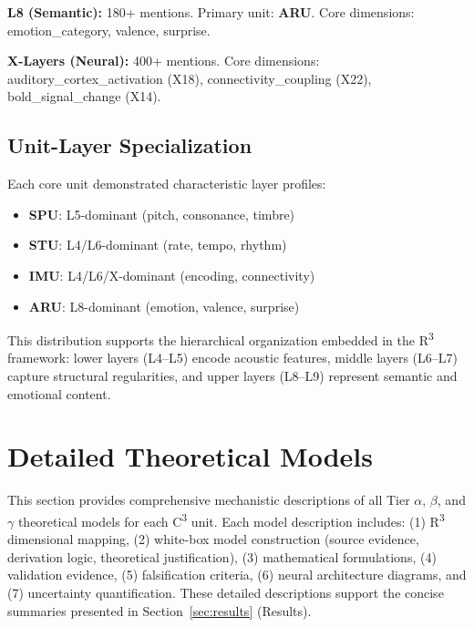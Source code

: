 \documentclass[9pt,onecolumn]{article}
\newcommand{\STU}{\textcolor{stucolor}{\textbf{STU}}}
\newcommand{\IMU}{\textcolor{imucolor}{\textbf{IMU}}}
\newcommand{\SPU}{\textcolor{spucolor}{\textbf{SPU}}}
\newcommand{\ARU}{\textcolor{arucolor}{\textbf{ARU}}}
\newcommand{\Rthree}{R\textsuperscript{3}}
\begin{document}
\textbf{L8 (Semantic):} 180+ mentions. Primary unit: \ARU{}. Core dimensions: emotion\_category, valence, surprise.

\textbf{X-Layers (Neural):} 400+ mentions. Core dimensions: auditory\_cortex\_activation (X18), connectivity\_coupling (X22), bold\_signal\_change (X14).

\subsection{Unit-Layer Specialization}

Each core unit demonstrated characteristic layer profiles:

\begin{itemize}[leftmargin=*, topsep=2pt, itemsep=1pt]
    \item \textbf{\SPU{}}: L5-dominant (pitch, consonance, timbre)
    \item \textbf{\STU{}}: L4/L6-dominant (rate, tempo, rhythm)
    \item \textbf{\IMU{}}: L4/L6/X-dominant (encoding, connectivity)
    \item \textbf{\ARU{}}: L8-dominant (emotion, valence, surprise)
\end{itemize}

This distribution supports the hierarchical organization embedded in the \Rthree{} framework: lower layers (L4--L5) encode acoustic features, middle layers (L6--L7) capture structural regularities, and upper layers (L8--L9) represent semantic and emotional content.


\section{Detailed Theoretical Models}
\label{sec:detailed-models}

This section provides comprehensive mechanistic descriptions of all Tier $\alpha$, $\beta$, and $\gamma$ theoretical models for each C\textsuperscript{3} unit. Each model description includes: (1) R\textsuperscript{3} dimensional mapping, (2) white-box model construction (source evidence, derivation logic, theoretical justification), (3) mathematical formulations, (4) validation evidence, (5) falsification criteria, (6) neural architecture diagrams, and (7) uncertainty quantification. These detailed descriptions support the concise summaries presented in Section~\ref{sec:results} (Results).
\end{document}
